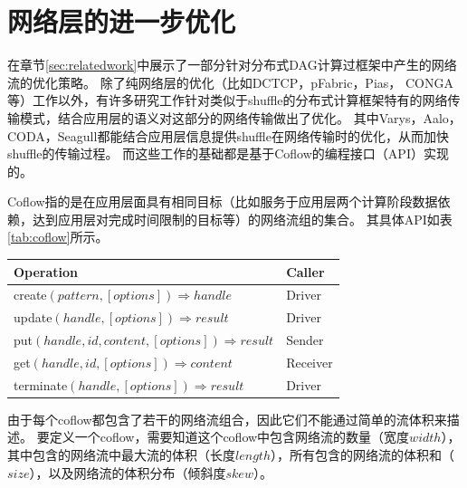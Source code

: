 \section{网络层的进一步优化}
\label{sec:network}

在章节\ref{sec:relatedwork}中展示了一部分针对分布式DAG计算过框架中产生的网络流的优化策略。
除了纯网络层的优化（比如DCTCP\cite{dctcp}，pFabric\cite{pfabric}，Pias\cite{pias}， CONGA\cite{conga}等）工作以外，有许多研究工作针对类似于shuffle的分布式计算框架特有的网络传输模式，结合应用层的语义对这部分的网络传输做出了优化。
其中Varys\cite{varys}，Aalo\cite{aalo}，CODA\cite{coda}，Seagull\cite{seagull}都能结合应用层信息提供shuffle在网络传输时的优化，从而加快shuffle的传输过程。
而这些工作的基础都是基于Coflow\cite{coflow}的编程接口（API）实现的。

Coflow指的是在应用层面具有相同目标（比如服务于应用层两个计算阶段数据依赖，达到应用层对完成时间限制的目标等）的网络流组的集合。
其具体API\cite{coflow}如表\ref{tab:coflow}所示。

\begin{table}[!hpb]
    \centering
    \begin{tabular}{ | m{10cm} | m{5cm} | }
        \hline
        Operation & Caller \\ [0.5ex]
        \hline
        \hline
        create$(pattern, [options]) \Rightarrow handle$ & Driver\\ \hline
        update$(handle, [options]) \Rightarrow result$ & Driver \\ \hline
        put$(handle, id, content, [options]) \Rightarrow result$ & Sender \\ \hline
        get$(handle, id, [options]) \Rightarrow content$ & Receiver \\ \hline
        terminate$(handle, [options]) \Rightarrow result$ & Driver \\ 
        \hline
    \end{tabular}
\end{table}

由于每个coflow都包含了若干的网络流组合，因此它们不能通过简单的流体积来描述。
要定义一个coflow，需要知道这个coflow中包含网络流的数量（宽度$width$），其中包含的网络流中最大流的体积（长度$length$），所有包含的网络流的体积和（$size$），以及网络流的体积分布（倾斜度$skew$）。

